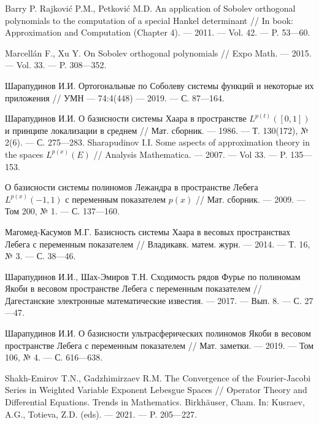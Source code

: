 \begin{thebibliography}{111}

{Barry P. Rajkovi\'c P.M., Petkovi\'c M.D.}
An application of Sobolev orthogonal polynomials to the computation of a special Hankel determinant
//
In book: Approximation and Computation (Chapter 4).
--- 2011.
--- Vol. 42.
--- P. 53---60.

{Marcell\'an F., Xu Y.}
On Sobolev orthogonal polynomials
//
Expo Math.
--- 2015.
--- Vol. 33.
--- P. 308---352.

Шарапудинов И.И.
Ортогональные по Соболеву системы функций и некоторые их приложения
//
УМН
--- 74:4(448)
--- 2019.
--- С. 87---164.

Шарапудинов И.И.
О базисности системы Хаара в пространстве $L^{p(t)}([0,1])$ и принципе локализации в среднем
//
Мат. сборник.
--- 1986.
--- Т. 130(172), № 2(6).
--- С. 275---283.
Sharapudinov I.I. Some aspects of approximation theory in the spaces $L^{p(x)}(E)$
//
Analysis Mathematica.
--- 2007.
--- Vol 33.
--- P. 135---153.

 О базисности системы полиномов Лежандра в пространстве Лебега $L^{p(x)}(-1,1)$ с переменным показателем $p(x)$ // Мат. сборник. --- 2009. --- Том 200, № 1. --- С. 137---160.

Магомед-Касумов М.Г.
Базисность системы Хаара в весовых пространствах Лебега с переменным показателем
//
Владикавк. матем. журн.
--- 2014.
--- Т. 16, № 3.
--- С. 38---46.

Шарапудинов И.И., Шах-Эмиров Т.Н. Сходимость рядов Фурье по полиномам Якоби в весовом пространстве Лебега с переменным показателем // Дагестанские электронные математические известия. --- 2017. --- Вып. 8. --- С. 27---47.


Шарапудинов И.И. О базисности ультрасферических полиномов Якоби в весовом пространстве Лебега с переменным показателем // Мат. заметки. --- 2019. --- Том 106, № 4. --- С. 616---638.

 Shakh-Emirov T.N., Gadzhimirzaev R.M.  The Convergence of the Fourier-Jacobi Series in Weighted Variable Exponent Lebesgue Spaces // Operator Theory and Differential Equations. Trends in Mathematics. Birkhäuser, Cham.  In: Kusraev, A.G., Totieva, Z.D. (eds). --- 2021. --- P. 205---227.
    

\end{thebibliography}
